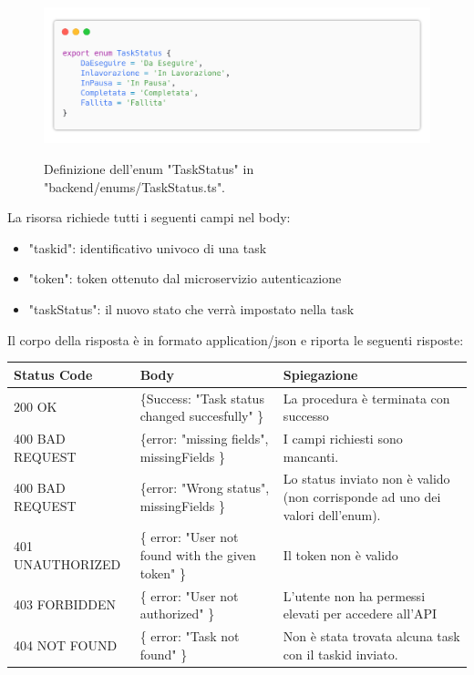 \documentclass{report}
\begin{document}
\begin{figure}[H]
	\centering\includegraphics[width=1\textwidth]{images/code_enum_taskStatus.png}
	
	Definizione dell'enum "TaskStatus" in "backend/enums/TaskStatus.ts".
\end{figure}

La risorsa richiede tutti i seguenti campi nel body:
\begin{itemize}
	\item "taskid": identificativo univoco di una task
	\item "token": token ottenuto dal microservizio autenticazione
	\item "taskStatus": il nuovo stato che verrà impostato nella task
\end{itemize}

Il corpo della risposta è in formato application/json e riporta le seguenti risposte:

\begin{center} %
	\centering
	\begin{tabular}{ |p{4cm}|p{4cm}|p{4cm}| }
		\hline
		\centering Status Code & \qquad\qquad\quad Body & \qquad\quad Spiegazione\\ %
		\hline
		200 OK & \{Success: "Task status changed succesfully" \}  & La procedura è terminata con successo	\\ 
		\hline
		400 BAD REQUEST & \{error: "missing fields", missingFields \} & I campi richiesti sono mancanti. \\
		\hline
		400 BAD REQUEST & \{error: "Wrong status", missingFields \} & Lo status inviato non è valido (non corrisponde ad uno dei valori dell'enum). \\
		\hline
		401 UNAUTHORIZED & \{ error: "User not found with the given token" \} & Il token non è valido \\
		\hline
		403 FORBIDDEN & \{ error: "User not authorized" \} &  L'utente non ha permessi elevati per accedere all'API \\
		\hline
		404 NOT FOUND & \{ error: "Task not found" \} & Non è stata trovata alcuna task con il taskid inviato. \\
		\hline
	\end{tabular}
\end{center}
\end{document}
